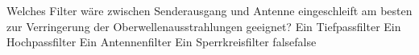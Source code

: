     {Welches Filter wäre zwischen Senderausgang und Antenne eingeschleift am besten zur Verringerung der Oberwellenausstrahlungen geeignet?}
    {Ein Tiefpassfilter}
    {Ein Hochpassfilter}
    {Ein Antennenfilter}
    {Ein Sperrkreisfilter}
    {false}{false}